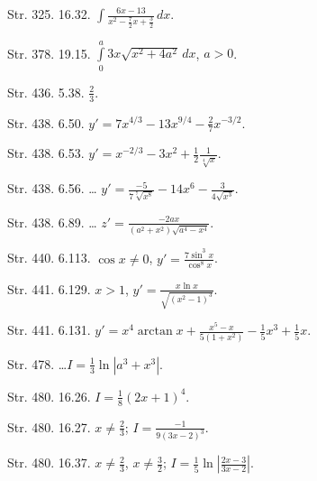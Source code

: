 \documentclass[a4paper,11pt]{article}
\begin{document}
Str. 325. 16.32.
$\int \frac{ 6 x - 13 }{ x^{ 2 } - \frac{ 7 }{ 2 } x + \frac{ 3 }{ 2 } }
\, dx$.

Str. 378. 19.15.
$\int\limits_{ 0 }^{ a } 3x \sqrt{ x^{ 2 } + 4 a^{ 2 } } \, dx$, $a > 0$.

Str. 436. 5.38. $\frac{ 2 }{ 3 }$.

Str. 438. 6.50.
$y' = 7 x^{ 4 / 3 } - 13 x^{ 9 / 4 } - \frac{ 2 }{ 7 } x^{ -3 / 2 }$.

Str. 438. 6.53.
$y' = x^{ -2 / 3 } - 3 x^{ 2 } + \frac{ 1 }{ 2 } \frac{ 1 }{ \sqrt[ 4 ]{ x } }$.

Str. 438. 6.56. \ldots
$y' = \frac{ -5 }{ 7 \sqrt[ 7 ]{ x^{ 8 } } } - 14 x^{ 6 }
- \frac{ 3 }{ 4 \sqrt{ x^{ 3 } } }$.

Str. 438. 6.89. \ldots
$z' = \frac{ -2 a x }{ ( a^{ 2 } + x^{ 2 } ) \sqrt{ a^{ 4 } - x^{ 4 } } }$.

Str. 440. 6.113. $\cos x \neq 0$, $y' = \frac{ 7 \sin^{ 3 } x }{ \cos^{ 8 } x }$.

Str. 441. 6.129. $x > 1$,
$y' = \frac{ x \ln x }{ \sqrt{ ( x^{ 2 } - 1 )^{ 3 } } }$.

Str. 441. 6.131.
$y' = x^{ 4 } \arctan x + \frac{ x^{ 5 } - x }{ 5 ( 1 + x^{ 2 } ) }
- \frac{ 1 }{ 5 } x^{ 3 } + \frac{ 1 }{ 5 } x$.

Str. 478. \ldots $I = \frac{ 1 }{ 3 } \ln| a^{ 3 } + x^{ 3 } |$.

Str. 480. 16.26. $I = \frac{ 1 }{ 8 } ( 2 x + 1 )^{ 4 }$.

Str. 480. 16.27. $x \neq \frac{ 2 }{ 3 }$;
$I = \frac{ -1 }{ 9 ( 3 x - 2 )^{ 3 } }$.

Str. 480. 16.37. $x \neq \frac{ 2 }{ 3 }$, $x \neq \frac{ 3 }{ 2 }$;
$I = \frac{ 1 }{ 5 } \ln| \frac{ 2 x - 3 }{ 3 x - 2 } |$.


\vspace{\spaceTwo}












\end{document}
